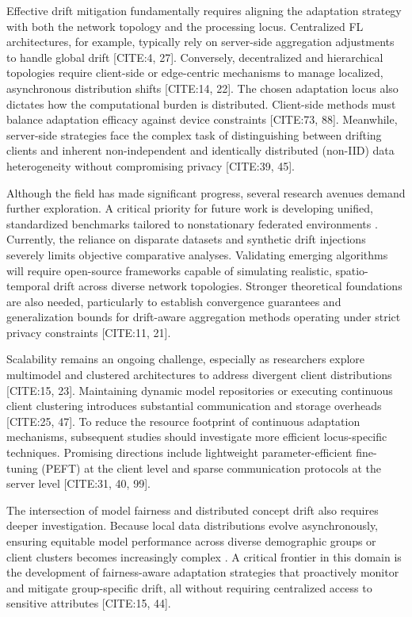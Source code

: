 \documentclass[journal]{IEEEtran}
\begin{document}
Effective drift mitigation fundamentally requires aligning the adaptation strategy with both the network topology and the processing locus. Centralized FL architectures, for example, typically rely on server-side aggregation adjustments to handle global drift [CITE:4, 27]. Conversely, decentralized and hierarchical topologies require client-side or edge-centric mechanisms to manage localized, asynchronous distribution shifts [CITE:14, 22]. The chosen adaptation locus also dictates how the computational burden is distributed. Client-side methods must balance adaptation efficacy against device constraints [CITE:73, 88]. Meanwhile, server-side strategies face the complex task of distinguishing between drifting clients and inherent non-independent and identically distributed (non-IID) data heterogeneity without compromising privacy [CITE:39, 45].

Although the field has made significant progress, several research avenues demand further exploration. A critical priority for future work is developing unified, standardized benchmarks tailored to nonstationary federated environments \cite{Mahdi2025}. Currently, the reliance on disparate datasets and synthetic drift injections severely limits objective comparative analyses. Validating emerging algorithms will require open-source frameworks capable of simulating realistic, spatio-temporal drift across diverse network topologies. Stronger theoretical foundations are also needed, particularly to establish convergence guarantees and generalization bounds for drift-aware aggregation methods operating under strict privacy constraints [CITE:11, 21].

Scalability remains an ongoing challenge, especially as researchers explore multimodel and clustered architectures to address divergent client distributions [CITE:15, 23]. Maintaining dynamic model repositories or executing continuous client clustering introduces substantial communication and storage overheads [CITE:25, 47]. To reduce the resource footprint of continuous adaptation mechanisms, subsequent studies should investigate more efficient locus-specific techniques. Promising directions include lightweight parameter-efficient fine-tuning (PEFT) at the client level and sparse communication protocols at the server level [CITE:31, 40, 99].

The intersection of model fairness and distributed concept drift also requires deeper investigation. Because local data distributions evolve asynchronously, ensuring equitable model performance across diverse demographic groups or client clusters becomes increasingly complex \cite{Badar2023}. A critical frontier in this domain is the development of fairness-aware adaptation strategies that proactively monitor and mitigate group-specific drift, all without requiring centralized access to sensitive attributes [CITE:15, 44].
\end{document}
